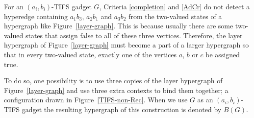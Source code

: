 \documentclass[%
12pt,
prereprint,
showpacs,
showkeys,
preprintnumbers,
amsmath,amssymb,
aps,
pra,
longbibliography,
notitlepage
]{revtex4-1}
\theoremstyle{definition}
\begin{document}
        For an $(a_i ,b_i)$-TIFS gadget $G$, Criteria \ref{completion} and \ref{AdCr} do not detect a hyperedge containing $a_1 b_3$, $a_2 b_1$ and $a_3 b_2$ from the two-valued states of a hypergraph like Figure~\ref{layer-graph}. This is because usually there are some two-valued states that assign false to all of these three vertices. Therefore, the layer hypergraph of Figure~\ref{layer-graph} must become a part of a larger hypergraph so that in every two-valued state, exactly one of the vertices $a$, $b$ or $c$ be assigned true.

        To do so, one possibility is to use three copies of the layer hypergraph of Figure~\ref{layer-graph} and use three extra contexts to bind them together; a configuration drawn in Figure~\ref{TIFS-non-Rec}. When we use $G$ as an $(a_i , b_i)$-TIFS gadget the resulting hypergraph of this construction is denoted by $B(G)$.
\end{document}

